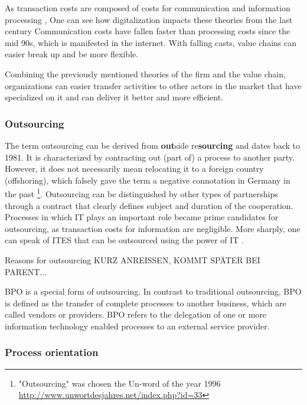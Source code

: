 		As transaction costs are composed of costs for communication and information processing \cite{evansted}, One can see how digitalization impacts these theories from the last century Communication costs have fallen faster than processing costs since the mid 90s, which is manifested in the internet. With falling casts, value chains can easier break up and be more flexible.
		
		Combining the previously mentioned theories of the firm and the value chain, organizations can easier transfer activities to other actors in the market that have specialized on it and can deliver it better and more efficient.  
		
			\subsubsection{Outsourcing}
		The term outsourcing can be derived from \textbf{out}side re\textbf{sourcing} and dates back to 1981. It is characterized by contracting out (part of) a process to another party. However, it does not necessarily mean relocating it to a foreign country (offshoring), which falsely gave the term a negative connotation in Germany in the past \footnote{ "Outsourcing" was chosen the Un-word of the year 1996 \url{http://www.unwortdesjahres.net/index.php?id=33}}. Outsourcing can be distinguished by other types of partnerships through a contract that clearly defines subject and duration of the cooperation. Processes in which IT plays an important role became prime candidates for outsourcing, as transaction costs for information are negligible. More sharply, one can speak of \acrfull{ITES} that can be outsourced using the power of IT \citep[]{Ramachandran2004}. 
		
		Reasons for outsourcing KURZ ANREISSEN, KOMMT SPÄTER BEI PARENT...
				
		\acrshort{BPO} is a special form of outsourcing. In contrast to traditional outsourcing, BPO is defined as the transfer of complete processes to another business, which are called vendors or providers. BPO refers to the delegation of one or more information technology enabled processes to an external service provider. 
		
		\subsubsection{Process orientation}
		
